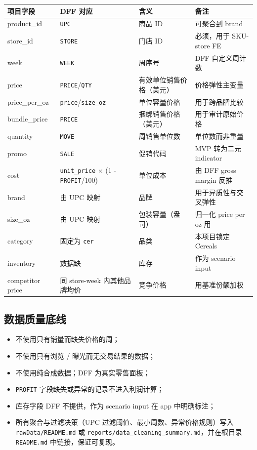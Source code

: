 \documentclass[UTF8,11pt,a4paper,fontset=none]{ctexart}
\begin{document}
\begin{tabularx}{\textwidth}{L{2.8cm}L{3.6cm}Y L{2.4cm}}
\toprule
项目字段 & DFF 对应 & 含义 & 备注 \\
\midrule
product\_id & \texttt{UPC} & 商品 ID & 可聚合到 brand \\
store\_id & \texttt{STORE} & 门店 ID & 必须，用于 SKU-store FE \\
week & \texttt{WEEK} & 周序号 & DFF 自定义周计数 \\
price & \texttt{PRICE}/\texttt{QTY} & 有效单位销售价格（美元） & 价格弹性主变量 \\
price\_per\_oz & \texttt{price}/\texttt{size\_oz} & 单位容量价格 & 用于跨品牌比较 \\
bundle\_price & \texttt{PRICE} & 捆绑销售价格（美元） & 用于审计原始价格 \\
quantity & \texttt{MOVE} & 周销售单位数 & 单位数而非重量 \\
promo & \texttt{SALE} & 促销代码 & MVP 转为二元 indicator \\
cost & \texttt{unit\_price} $\times$ (1 - \texttt{PROFIT}/100) & 单位成本 & 由 DFF gross margin 反推 \\
brand & 由 UPC 映射 & 品牌 & 用于异质性与交叉弹性 \\
size\_oz & 由 UPC 映射 & 包装容量（盎司） & 归一化 price per oz 用 \\
category & 固定为 \texttt{cer} & 品类 & 本项目锁定 Cereals \\
inventory & 数据缺 & 库存 & 作为 scenario input \\
competitor price & 同 store-week 内其他品牌均价 & 竞争价格 & 用基准份额加权 \\
\bottomrule
\end{tabularx}

\subsection{数据质量底线}

\begin{itemize}
  \item 不使用只有销量而缺失价格的周；
  \item 不使用只有浏览 / 曝光而无交易结果的数据；
  \item 不使用纯合成数据；DFF 为真实零售面板；
  \item \texttt{PROFIT} 字段缺失或异常的记录不进入利润计算；
  \item 库存字段 DFF 不提供，作为 scenario input 在 app 中明确标注；
  \item 所有聚合与过滤决策（UPC 过滤阈值、最小周数、异常价格规则）写入 \texttt{rawData/README.md} 或 \texttt{reports/data\_cleaning\_summary.md}，并在根目录 \texttt{README.md} 中链接，保证可复现。
\end{itemize}
\end{document}
